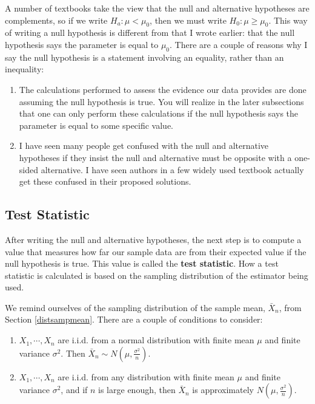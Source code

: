\documentclass[
]{book}
\theoremstyle{definition}
\theoremstyle{definition}
\theoremstyle{definition}
\theoremstyle{definition}
\theoremstyle{remark}
\begin{document}
A number of textbooks take the view that the null and alternative hypotheses are complements, so if we write \(H_a: \mu < \mu_0\), then we must write \(H_0: \mu \geq \mu_0\). This way of writing a null hypothesis is different from that I wrote earlier: that the null hypothesis says the parameter is equal to \(\mu_0\). There are a couple of reasons why I say the null hypothesis is a statement involving an equality, rather than an inequality:

\begin{enumerate}
\def\labelenumi{\arabic{enumi}.}
\item
  The calculations performed to assess the evidence our data provides are done assuming the null hypothesis is true. You will realize in the later subsections that one can only perform these calculations if the null hypothesis says the parameter is equal to some specific value.
\item
  I have seen many people get confused with the null and alternative hypotheses if they insist the null and alternative must be opposite with a one-sided alternative. I have seen authors in a few widely used textbook actually get these confused in their proposed solutions.
\end{enumerate}

\hypertarget{test-statistic}{%
\subsection{Test Statistic}\label{test-statistic}}

After writing the null and alternative hypotheses, the next step is to compute a value that measures how far our sample data are from their expected value if the null hypothesis is true. This value is called the \textbf{test statistic}. How a test statistic is calculated is based on the sampling distribution of the estimator being used.

We remind ourselves of the sampling distribution of the sample mean, \(\bar{X}_n\), from Section \ref{distsampmean}. There are a couple of conditions to consider:

\begin{enumerate}
\def\labelenumi{\arabic{enumi}.}
\item
  \(X_1, \cdots, X_n\) are i.i.d. from a normal distribution with finite mean \(\mu\) and finite variance \(\sigma^2\). Then \(\bar{X}_n \sim N(\mu, \frac{\sigma^2}{n})\).
\item
  \(X_1, \cdots, X_n\) are i.i.d. from any distribution with finite mean \(\mu\) and finite variance \(\sigma^2\), and if \(n\) is large enough, then \(\bar{X}_n\) is approximately \(N(\mu, \frac{\sigma^2}{n})\).
\end{enumerate}
\end{document}
